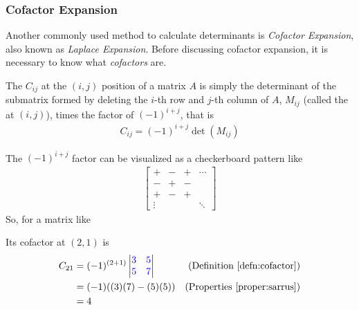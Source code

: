 \subsubsection{Cofactor Expansion}
Another commonly used method to calculate determinants is \textit{Cofactor Expansion}, also known as \textit{Laplace Expansion}. Before discussing cofactor expansion, it is necessary to know what \textit{cofactors} are.
\begin{defn}
\label{defn:cofactor}
The  $C_{ij}$ at the $(i, j)$ position of a matrix $A$ is simply the determinant of the submatrix formed by deleting the $i$-th row and $j$-th column of $A$, $M_{ij}$ (called the  at $(i, j)$), times the factor of $(-1)^{i+j}$, that is
\begin{align}
C_{ij} = (-1)^{i+j} \det(M_{ij})    
\end{align}
\end{defn}
The $(-1)^{i+j}$ factor can be visualized as a checkerboard pattern like
\begin{align*}
\begin{bmatrix}
+ & - & + & \cdots \\
- & + & - &  \\
+ & - & + &  \\
\vdots & &  & \ddots
\end{bmatrix}
\end{align*}
So, for a matrix like
\begin{center}
\end{center}
Its cofactor at $(2, 1)$ is
\begin{align*}
C_{21} &= (-1)^{(2+1)}
\begin{vmatrix}
\mathcolor{blue}{3} & \mathcolor{blue}{5} \\
\mathcolor{blue}{5} & \mathcolor{blue}{7}
\end{vmatrix} & \text{(Definition \ref{defn:cofactor})} \\
&= (-1)((3)(7) - (5)(5)) & \text{(Properties \ref{proper:sarrus})} \\
&= 4
\end{align*}

